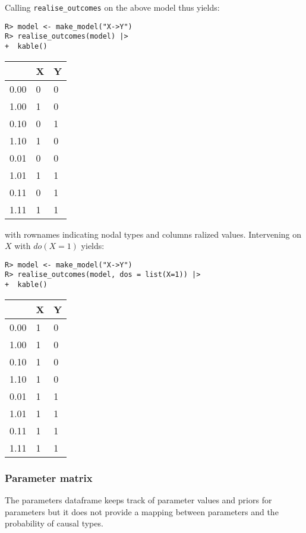 \documentclass[
  11pt,
  article]{jss}
\begin{document}
Calling \texttt{realise\_outcomes} on the above model thus yields:

\begin{verbatim}
R> model <- make_model("X->Y") 
R> realise_outcomes(model) |>
+  kable()
\end{verbatim}

\begin{tabular}{l|l|l}
\hline
  & X & Y\\
\hline
0.00 & 0 & 0\\
\hline
1.00 & 1 & 0\\
\hline
0.10 & 0 & 1\\
\hline
1.10 & 1 & 0\\
\hline
0.01 & 0 & 0\\
\hline
1.01 & 1 & 1\\
\hline
0.11 & 0 & 1\\
\hline
1.11 & 1 & 1\\
\hline
\end{tabular}

with rownames indicating nodal types and columns ralized values.
Intervening on \(X\) with \(do(X=1)\) yields:

\begin{verbatim}
R> model <- make_model("X->Y") 
R> realise_outcomes(model, dos = list(X=1)) |>
+  kable()
\end{verbatim}

\begin{tabular}{l|l|l}
\hline
  & X & Y\\
\hline
0.00 & 1 & 0\\
\hline
1.00 & 1 & 0\\
\hline
0.10 & 1 & 0\\
\hline
1.10 & 1 & 0\\
\hline
0.01 & 1 & 1\\
\hline
1.01 & 1 & 1\\
\hline
0.11 & 1 & 1\\
\hline
1.11 & 1 & 1\\
\hline
\end{tabular}

\hypertarget{parameter-matrix}{%
\subsubsection{Parameter matrix}\label{parameter-matrix}}

The parameters dataframe keeps track of parameter values and priors for
parameters but it does not provide a mapping between parameters and the
probability of causal types.
\end{document}
